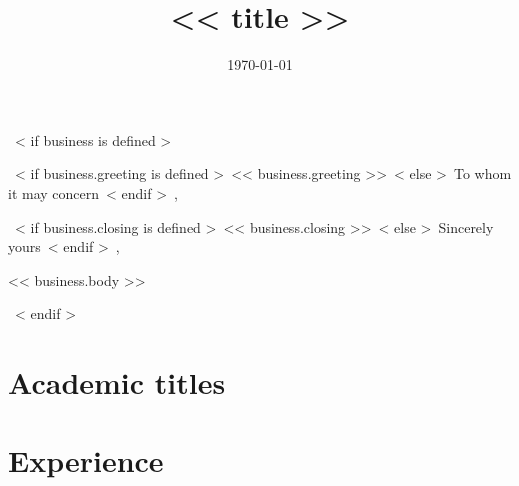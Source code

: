 \documentclass{moderncv}
\title{<< title >>}
\begin{document}
~< if business is defined >~
\date{\today}
\opening{~< if business.greeting is defined >~<< business.greeting >>~< else >~To whom it may concern~< endif >~,}
\closing{~< if business.closing is defined >~<< business.closing >>~< else >~Sincerely yours~< endif >~,}

\makelettertitle            %
<< business.body >>

\makeletterclosing          %
\newpage
\setcounter{page}{1}
~< endif >~


\makecvtitle
\section{Academic titles}
\newpage
\section{Experience}
\end{document}

